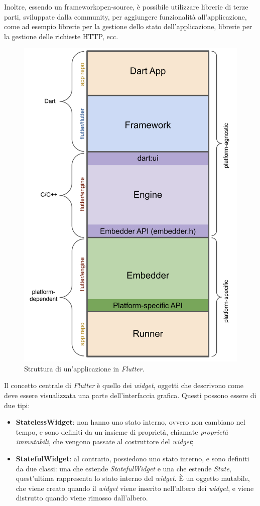Inoltre, essendo un \gls{framework}\glsoccur \gls{open-source}\glsoccur, è possibile utilizzare librerie di terze parti, sviluppate dalla community, per aggiungere funzionalità all'applicazione, come ad esempio librerie per la gestione dello stato dell'applicazione, librerie per la gestione delle richieste HTTP, ecc. \\

\begin{figure}[!h] 
    \centering 
    \includegraphics[width=0.4\columnwidth]{images/flutter-app-anatomy.png} 
    \caption{Struttura di un'applicazione in \emph{Flutter}.}
    \label{fig:architettura-flutter}
\end{figure}

Il concetto centrale di \emph{Flutter}\cite{site:flutter} è quello dei \emph{widget}, oggetti che descrivono come deve essere visualizzata una parte dell'interfaccia grafica. Questi possono essere di due tipi:
\begin{itemize}
    \item \textbf{StatelessWidget}: non hanno uno stato interno, ovvero non cambiano nel tempo, e sono definiti da un insieme di proprietà, chiamate \emph{proprietà immutabili}, che vengono passate al costruttore del \emph{widget};
    \item \textbf{StatefulWidget}: al contrario, possiedono uno stato interno, e sono definiti da due classi: una che estende \emph{StatefulWidget} e una che estende \emph{State}, quest'ultima rappresenta lo stato interno del \emph{widget}. È un oggetto mutabile, che viene creato quando il \emph{widget} viene inserito nell'albero dei \emph{widget}, e viene distrutto quando viene rimosso dall'albero.
\end{itemize}

